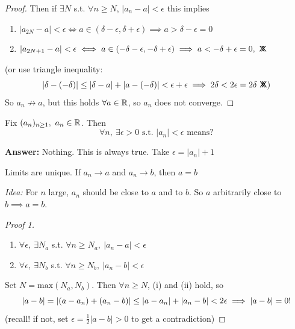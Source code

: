 \documentclass[10pt,twoside]{scrartcl}
\newcommand*{\cont}{%
  \mathsf{X}\mkern-8.5mu\mathsf{X}%
}
\begin{document}
\begin{example}
\begin{proof}
 Then if $\exists N$ s.t. $\forall n \geq N$, $|a_n - a| <\epsilon$ this implies
\begin{enumerate}
\item $|a_{2N} - a | < \epsilon \iff a \in (\delta - \epsilon, \delta + \epsilon)\implies a > \delta - \epsilon =0$ 
\item $|a_{2N+1} - a | < \epsilon\iff a \in (-\delta - \epsilon,-\delta + \epsilon) \implies a < -\delta + \epsilon = 0,~\cont$ 
\end{enumerate}
(or use triangle inequality: \[|\delta - (-\delta)| \leq |\delta - a| + |a -(-\delta)| < \epsilon + \epsilon \implies 2\delta < 2\epsilon = 2\delta ~\cont\text{)}\]
So $a_n \not\to a$, but this holds $\forall a \in \mathbb{R}$, so $a_n$ does not converge.
\end{proof}
\end{example}\vspace*{10pt}

\begin{clicker}
Fix $(a_n)_{n\geq 1},~a_n \in \mathbb{R}$. Then \[\forall n,~\exists \epsilon >0 \text{ s.t. } |a_n| < \epsilon \text{ means?}\]

\textbf{Answer:} Nothing. This is always true. Take $\epsilon = |a_n| + 1$	
\end{clicker}\vspace*{10pt}


\begin{theorem}
Limits are unique. If $a_n \to a$ and $a_n \to b$, then $a=b$	
\end{theorem}

\emph{Idea:} For $n$ large, $a_n$ should be close to $a$ and to $b$. So $a$ arbitrarily close to $b \implies a = b$. 

\begin{proof}[Proof 1]~
\begin{enumerate}
\item $\forall \epsilon,~\exists N_a$ s.t. $\forall n \geq N_a,~|a_n - a| < \epsilon$ 

\item $\forall \epsilon,~\exists N_b$ s.t. $\forall n \geq N_b,~|a_n - b| < \epsilon$
\end{enumerate}

Set $N = \mathrm{max}(N_a,N_b)$. Then $\forall n \geq N$, (i) and (ii) hold, so
\[|a - b| = |(a-a_n) + (a_n - b)| \leq |a - a_n| + |a_n - b| < 2\epsilon \implies |a-b| = 0!\qedhere\]
(recall! if not, set $\epsilon = \frac{1}{2}|a-b| >0$ to get a contradiction)
\end{proof}\vsp
\end{document}
